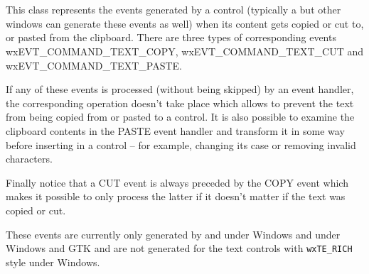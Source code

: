 
\section{}\label{wxclipboardtextevent}

This class represents the events generated by a control (typically a 
 but other windows can generate these events as
well) when its content gets copied or cut to, or pasted from the clipboard.
There are three types of corresponding events wxEVT\_COMMAND\_TEXT\_COPY,
wxEVT\_COMMAND\_TEXT\_CUT and wxEVT\_COMMAND\_TEXT\_PASTE.

If any of these events is processed (without being skipped) by an event
handler, the corresponding operation doesn't take place which allows to prevent
the text from being copied from or pasted to a control. It is also possible to
examine the clipboard contents in the PASTE event handler and transform it in
some way before inserting in a control -- for example, changing its case or
removing invalid characters.

Finally notice that a CUT event is always preceded by the COPY event which
makes it possible to only process the latter if it doesn't matter if the text
was copied or cut.


These events are currently only generated by  and
under Windows and  under Windows and GTK and
are not generated for the text controls with \texttt{wxTE\_RICH} style under
Windows.



\\
\\




